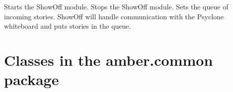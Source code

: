 \begin{classinterface}
\end{classinterface}




\begin{classmetadata}
\end{classmetadata}

\begin{classinterface}
\end{classinterface}




\begin{classmetadata}
\end{classmetadata}

\begin{classinterface}
    {Starts the ShowOff module.}
    {Stops the ShowOff module.}
    {Sets the queue of incoming stories. ShowOff will handle communication with
    the Psyclone whiteboard and puts stories in the queue.}
\end{classinterface}




\begin{classmetadata}
\end{classmetadata}

\begin{classinterface}
\end{classinterface}




\begin{classmetadata}
\end{classmetadata}

\begin{classinterface}
\end{classinterface}



\section{Classes in the amber.common package}


